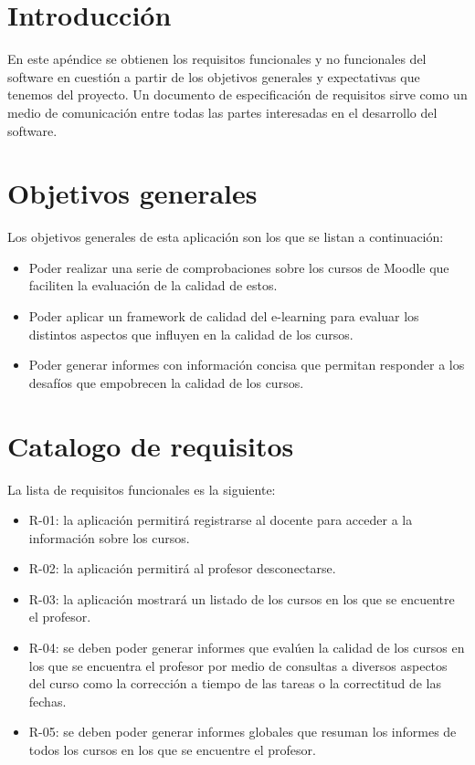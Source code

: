 \label{apendice:B}
\section{Introducción}
En este apéndice se obtienen los requisitos funcionales y no funcionales del software en cuestión a partir de los objetivos generales y expectativas que tenemos del proyecto. Un documento de especificación de requisitos sirve como un medio de comunicación entre todas las partes interesadas en el desarrollo del software.
\section{Objetivos generales}
	Los objetivos generales de esta aplicación son los que se listan a continuación:
\begin{itemize}
	\item
	Poder realizar una serie de comprobaciones sobre los cursos de Moodle que faciliten la evaluación de la calidad de estos.
	\item
	Poder aplicar un framework de calidad del e-learning para evaluar los distintos aspectos que influyen en la calidad de los cursos.
	\item
	Poder generar informes con información concisa que permitan responder a los desafíos que empobrecen la calidad de los cursos.
\end{itemize}

\section{Catalogo de requisitos}
La lista de requisitos funcionales es la siguiente:
\begin{itemize}
	\item R-01: la aplicación permitirá registrarse al docente para acceder a la información sobre los cursos.
	\item R-02: la aplicación permitirá al profesor desconectarse.
	\item R-03: la aplicación mostrará un listado de los cursos en los que se encuentre el profesor.
	\item R-04: se deben poder generar informes que evalúen la calidad de los cursos en los que se encuentra el profesor por medio de consultas a diversos aspectos del curso como la corrección a tiempo de las tareas o la correctitud de las fechas.
	\item R-05: se deben poder generar informes globales que resuman los informes de todos los cursos en los que se encuentre el profesor.
\end{itemize}

